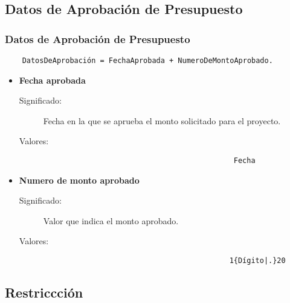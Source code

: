 \subsection{Datos de Aprobación de Presupuesto}
\label{dd:DSPresupuestos}
\subsubsection{Datos de Aprobación de Presupuesto}
\begin{lstlisting}
	DatosDeAprobación = FechaAprobada + NumeroDeMontoAprobado.
\end{lstlisting}
\begin{itemize}

 \item \textbf{Fecha aprobada}
		\begin{description}
			\item [Significado:] Fecha en la que se aprueba el monto solicitado para el proyecto.
			\item [Valores:]{\begin{lstlisting}
                                         	Fecha
                                         \end{lstlisting}} 
		\end{description}

        \item \textbf{Numero de monto aprobado}
		\begin{description}
			\item [Significado:] Valor que indica el monto aprobado.
			\item [Valores:]{\begin{lstlisting}
                                           1{Dígito|.}20
                                         \end{lstlisting}} 
		\end{description}
\end{itemize}
\subsection{Restriccción}
\label{dd:Restriccion}
